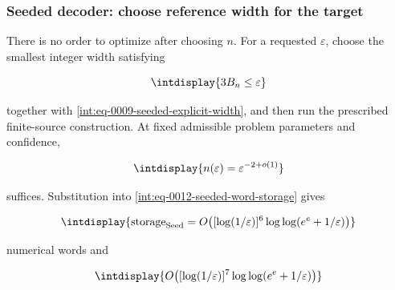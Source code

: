 \subsubsection{Seeded decoder: choose reference width for the target}



There is no order to optimize after choosing \(n\). For a requested \(\varepsilon\), choose the smallest integer width satisfying


\begingroup\renewcommand{\theHequation}{intdisplay.27}
\begin{equation}
\intdisplay{
3B_n\le\varepsilon
}
\label{int:eq-0024-seeded-inverse-error-test}
\end{equation}
\endgroup


together with \eqref{int:eq-0009-seeded-explicit-width}, and then run the prescribed finite-source construction. At fixed admissible problem parameters and confidence,


\begingroup\renewcommand{\theHequation}{intdisplay.28}
\begin{equation}
\intdisplay{
n(\varepsilon)=\varepsilon^{-2+o(1)}
}
\label{int:eq-0025-seeded-inverse-width-rate}
\end{equation}
\endgroup


suffices. Substitution into \eqref{int:eq-0012-seeded-word-storage} gives


\begingroup\renewcommand{\theHequation}{intdisplay.29}
\begin{equation}
\intdisplay{
\operatorname{storage}_{\rm Seed}
=O\!\left([\log(1/\varepsilon)]^6
\log\log(e^e+1/\varepsilon)\right)
}
\label{int:eq-0026-seeded-inverse-word-storage}
\end{equation}
\endgroup


numerical words and


\begingroup\renewcommand{\theHequation}{intdisplay.30}
\begin{equation}
\intdisplay{
O\!\left([\log(1/\varepsilon)]^7
\log\log(e^e+1/\varepsilon)\right)
}
\label{int:eq-0027-seeded-inverse-bit-storage}
\end{equation}
\endgroup


